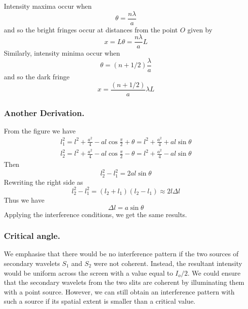 \documentclass[../../../main.tex]{subfiles}
\begin{document}
Intensity maxima occur when
\begin{equation*}
    \theta=\frac{n\lambda}{a}
\end{equation*}
and so the bright fringes occur at distances from the point $O$ given by
\begin{equation*}
    x=L\theta=\frac{n\lambda}{a}L
\end{equation*}
Similarly, intensity minima occur when
\begin{equation*}
    \theta=(n+1/2)\frac{\lambda}{a}
\end{equation*}
and so the dark fringe 
\begin{equation*}
    x=\frac{(n+1/2)}{a}\lambda L
\end{equation*}

\subsubsection{Another Derivation.} From the figure we have 
\begin{align*}
    l_1^2=l^2+\frac{a^2}{4}-al\cos \frac{\pi}{2}+\theta=l^2+\frac{a^2}{4}+al\sin \theta\\
    l_2^2=l^2+\frac{a^2}{4}-al\cos \frac{\pi}{2}-\theta=l^2+\frac{a^2}{4}-al\sin \theta
\end{align*}
Then 
\begin{equation*}
    l_2^2- l_1^2=2al\sin\theta
\end{equation*}
Rewriting the right side as 
\begin{equation*}
    l_2^2- l_1^2=(l_2+l_1)(l_2-l_1)\approx 2l\Delta l
\end{equation*}
Thus we have 
\begin{equation*}
    \Delta l=a \sin \theta
\end{equation*}
Applying the interference conditions, we get the same results.

\subsubsection{Critical angle.} We emphasise that there would be no interference pattern if the two sources of secondary wavelets $S_1$ and $S_2$ were not coherent. Instead, the resultant intensity would be uniform across the screen with a value equal to $I_o/2$. We could ensure that the secondary wavelets from the two slits are coherent  by illuminating them with a point source. However, we can still obtain an interference pattern with such a source if its spatial extent is smaller than a critical value.
\end{document}
